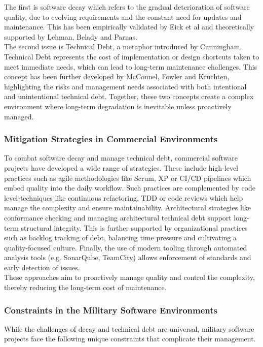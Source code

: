 The first is software decay which refers to the gradual deterioration of software quality, due to evolving requirements and the constant need for updates and maintenance. This has been empirically validated by Eick et al and theoretically supported by Lehman, Belady and Parnas.\\
The second issue is Technical Debt, a metaphor introduced by Cunningham. Technical Debt represents the cost of implementation or design shortcuts taken to meet immediate needs, which can lead to long-term maintenance challenges. This concept has been further developed by McConnel, Fowler and Kruchten, highlighting the risks and management needs
associated with both intentional and unintentional technical debt. Together, these two concepts create a complex environment where long-term degradation is inevitable unless proactively managed.\\

\subsubsection{Mitigation Strategies in Commercial Environments}
To combat software decay and manage technical debt, commercial software projects have developed a wide range of strategies. These include high-level practices such as agile methodologies like Scrum, \ac{XP} or CI/CD pipelines which embed quality into the daily workflow.
Such practices are complemented by code level-techniques like continuous refactoring, \ac{TDD} or code reviews which help manage the complexity and ensure maintainability. Architectural strategies like conformance checking and managing architectural technical debt support long-term structural integrity.
This is further supported by organizational practices such as backlog tracking of debt, balancing time pressure and cultivating a quality-focused culture. Finally, the use of modern tooling through automated analysis tools (e.g. SonarQube, TeamCity) allows enforcement of standards and early detection of issues.\\

These approaches aim to proactively manage quality and control the complexity, thereby reducing the long-term cost of maintenance. 

\subsubsection{Constraints in the Military Software Environments}
While the challenges of decay and technical debt are universal, military software projects face the following unique constraints that complicate their management.\\

